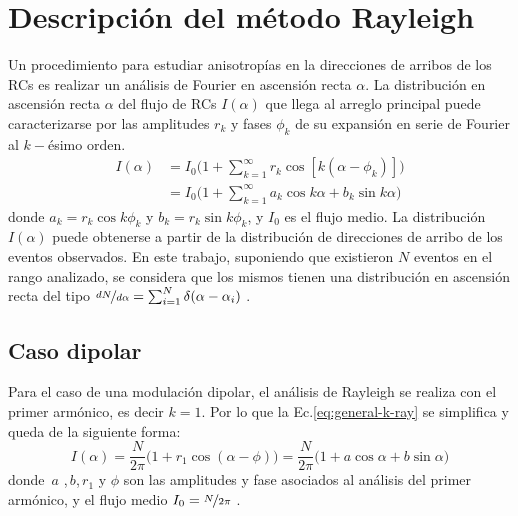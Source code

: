   \section{Descripción del método Rayleigh}
  Un procedimiento para estudiar anisotropías en la direcciones de arribos de los RCs es realizar un análisis de Fourier en ascensión recta $\alpha$. La distribución en ascensión recta $\alpha$ del flujo de RCs $I(\alpha)$ que llega al arreglo principal puede caracterizarse por las amplitudes $r_k$ y fases $\phi_k$ de su expansión en serie de Fourier al $k-$ésimo orden. 
  \begin{align}
    I(\alpha) &= I_0 \bigg ( 1+ \sum^\infty_{k=1} r_k\cos{[k(\alpha - \phi_k)]} \bigg) \\
              &= I_0 \bigg ( 1+ \sum^\infty_{k=1} a_k\cos{k\alpha} +  b_k\sin{k\alpha} \bigg ) \label{eq:general-k-ray}
  \end{align}
  donde $a_k=r_k\cos k\phi_k$ y $b_k=r_k\sin k \phi_k$, y $I_0$ es el flujo medio. La distribución $I(\alpha)$ puede obtenerse a partir de la distribución de direcciones de arribo de los eventos observados.  En este trabajo, suponiendo que existieron $N$ eventos en el rango analizado, se considera que los mismos tienen una distribución en ascensión recta del tipo $\nicefrac{dN}{d\alpha}= \sum^N_{i=1} \delta(\alpha - \alpha_i)$ \cite{taborda}. 

  \subsection{Caso dipolar} \label{caso_dipolar}
  {Para el caso de una modulación dipolar, el análisis de Rayleigh se realiza con el primer armónico, es decir $k=1$. Por lo que la Ec.\ref{eq:general-k-ray} se simplifica y queda de la siguiente forma:}
  \begin{equation}
    I(\alpha) = \frac{N}{2\pi} \bigg ( 1+ r_1\cos{(\alpha - \phi)} \bigg) = \frac{N}{2\pi}\bigg ( 1+ a\cos{\alpha} +  b\sin{\alpha} \bigg ) \label{eq:general-1-ray}
  \end{equation}
  donde $\, a$ ,$\, b$,$\, r_1$ y $\phi$ son las amplitudes y fase asociados al análisis del primer armónico, y el flujo medio $I_0=\nicefrac{N}{2\pi}$ \cite{taborda}.

  

